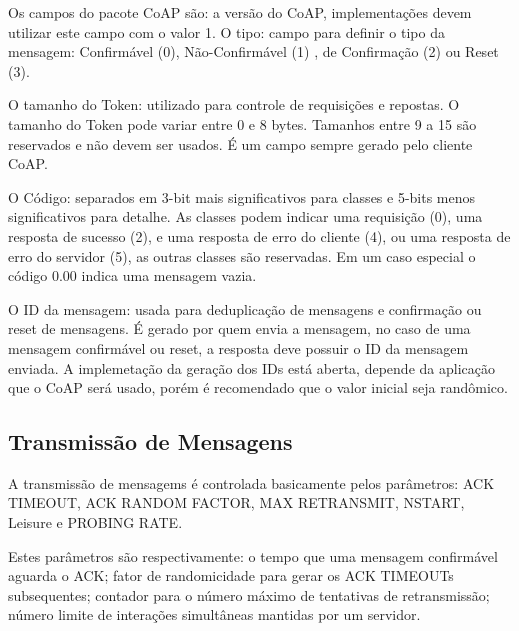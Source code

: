 Os campos do pacote CoAP s\~ao: a vers\~ao do CoAP, implementa\c{c}\~oes devem utilizar este campo com o valor 1. O tipo: campo para definir o tipo da mensagem: Confirm\'avel (0), N\~ao-Confirm\'avel (1) , de Confirma\c{c}\~ao (2) ou Reset (3).

O tamanho do Token: utilizado para controle de requisi\c{c}\~oes e repostas. O tamanho do Token pode variar entre 0 e 8 bytes. Tamanhos entre 9 a 15 s\~ao reservados e n\~ao devem ser usados. \'E um campo sempre gerado pelo cliente CoAP.

O C\'odigo: separados em 3-bit mais significativos para classes e 5-bits menos significativos para detalhe. As classes podem indicar uma requisi\c{c}\~ao (0), uma resposta de sucesso (2), e uma resposta de erro do cliente (4), ou uma resposta de erro do servidor (5), as outras classes s\~ao reservadas. Em um caso especial o c\'odigo 0.00 indica uma mensagem vazia.

O ID da mensagem: usada para deduplica\c{c}\~ao de mensagens e confirma\c{c}\~ao ou reset de mensagens. \'E gerado por quem envia a mensagem, no caso de uma mensagem confirm\'avel ou reset, a resposta deve possuir o ID da mensagem enviada. A implemeta\c{c}\~ao da gera\c{c}\~ao dos IDs est\'a aberta, depende da aplica\c{c}\~ao que o CoAP ser\'a usado, por\'em \'e recomendado que o valor inicial seja rand\^omico.
   
\subsection{Transmiss\~ao de Mensagens}
A transmiss\~ao de mensagems \'e controlada basicamente pelos par\^ametros: ACK TIMEOUT, ACK RANDOM FACTOR, MAX RETRANSMIT, NSTART, Leisure e PROBING RATE.

Estes par\^ametros s\~ao respectivamente: o tempo que uma mensagem confirm\'avel aguarda o ACK; fator de randomicidade para gerar os ACK TIMEOUTs subsequentes; contador para o n\'umero m\'aximo de tentativas de retransmiss\~ao; n\'umero limite de intera\c{c}\~oes simult\^aneas mantidas por um servidor.

